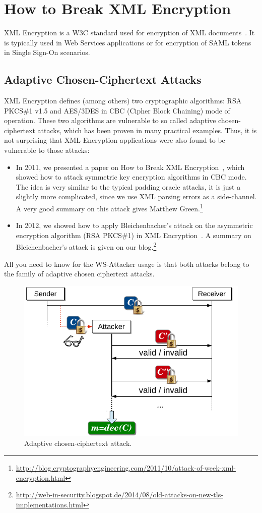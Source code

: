 \section{How to Break XML Encryption}

XML Encryption is a W3C standard used for encryption of XML documents~\cite{Eastlake2013}. It is typically used in Web Services applications or for encryption of SAML tokens in Single Sign-On scenarios.

\subsection{Adaptive Chosen-Ciphertext Attacks}

XML Encryption defines (among others) two cryptographic algorithms: RSA PKCS\#1 v1.5 and AES/3DES in CBC (Cipher Block Chaining) mode of operation. These two algorithms are vulnerable to so called adaptive chosen-ciphertext attacks, which has been proven in many practical examples. Thus, it is not surprising that XML Encryption applications were also found to be vulnerable to those attacks:

\begin{itemize}
 \item In 2011, we presented a paper on How to Break XML Encryption~\cite{CCS:JagSom11}, which showed how to attack symmetric key encryption algorithms in CBC mode. The idea is very similar to the typical padding oracle attacks, it is just a slightly more complicated, since we use XML parsing errors as a side-channel. A very good summary on this attack gives Matthew Green.\footnote{\url{http://blog.cryptographyengineering.com/2011/10/attack-of-week-xml-encryption.html}}
 \item In 2012, we showed how to apply Bleichenbacher's attack on the asymmetric encryption algorithm (RSA PKCS\#1) in XML Encryption~\cite{ESORICS:JagSchSom12}. A summary on Bleichenbacher's attack is given on our blog.\footnote{\url{http://web-in-security.blogspot.de/2014/08/old-attacks-on-new-tls-implementations.html}}
\end{itemize}

All you need to know for the WS-Attacker usage is that both attacks belong to the family of adaptive chosen ciphertext attacks.

\begin{figure}[ht]
    \begin{center}
        \includegraphics[width=0.5\linewidth]{img/attacker-model-practice2}
    \end{center}
    \caption{Adaptive chosen-ciphertext attack.}
    \label{fig:attacker-model-practice2}
\end{figure}

